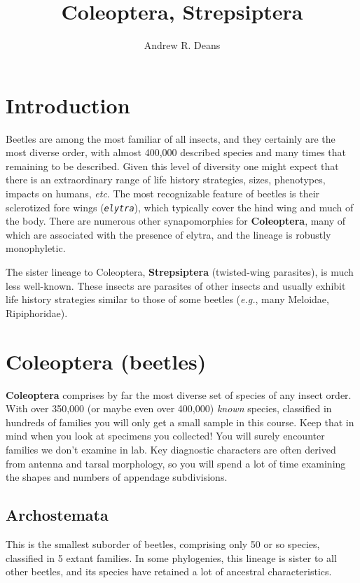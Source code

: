 \documentclass[letterpaper, 11pt]{article}
\title{Coleoptera, Strepsiptera}
\author{Andrew R. Deans}
\newcommand{\latinword}[1]{\texttt{\itshape #1}}%
\begin{document}
\cleanlookdateon %
\maketitle
\thispagestyle{fancy}
\section*{Introduction}
Beetles are among the most familiar of all insects, and they certainly are the most diverse order, with almost 400,000 described species and many times that remaining to be described. Given this level of diversity one might expect that there is an extraordinary range of life history strategies, sizes, phenotypes, impacts on humans, \textit{etc}. The most recognizable feature of beetles is their sclerotized fore wings (\latinword{elytra}), which typically cover the hind wing and much of the body. There are numerous other synapomorphies for \textbf{Coleoptera}, many of which are associated with the presence of elytra, and the lineage is robustly monophyletic. 

The sister lineage to Coleoptera, \textbf{Strepsiptera} (twisted-wing parasites), is much less well-known. These insects are parasites of other insects and usually exhibit life history strategies similar to those of some beetles (\textit{e.g.}, many Meloidae, Ripiphoridae).

\section{Coleoptera (beetles)}
\textbf{Coleoptera} comprises by far the most diverse set of species of any insect order. With over 350,000 (or maybe even over 400,000) \textit{known} species, classified in hundreds of families you will only get a small sample in this course. Keep that in mind when you look at specimens you collected! You will surely encounter families we don't examine in lab. Key diagnostic characters are often derived from antenna and tarsal morphology, so you will spend a lot of time examining the shapes and numbers of appendage subdivisions.

\subsection{Archostemata}
This is the smallest suborder of beetles, comprising only 50 or so species, classified in 5 extant families. In some phylogenies, this lineage is sister to all other beetles, and its species have retained a lot of ancestral characteristics.
\end{document}
